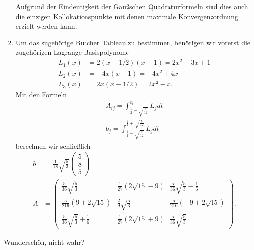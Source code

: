 \begin{solution}
\begin{enumerate}[label = \textbf{\alph*)}]
  Aufgrund der Eindeutigkeit der Gaußschen Quadraturformeln sind dies auch die
  einzigen Kollokationspunkte mit denen maximale Konvergenzordnung erzielt werden kann.
  \item Um das zugehörige Butcher Tableau zu bestimmen, benötigen wir vorerst die
  zugehörigen Lagrange Basispolynome
  \begin{align*}
    L_1(x) &= 2(x - 1/2)(x - 1) = 2x^2 - 3x + 1\\
    L_2(x) &= -4x(x - 1) = -4x^2 + 4x\\
    L_3(x) &= 2x(x - 1/2) = 2x^2 - x.
  \end{align*}
  Mit den Formeln
  \begin{align*}
    A_{ij} = \int_{\frac{1}{2} - \sqrt{\frac{5}{12}}}^{c_i} L_j dt \\
    b_j = \int_{\frac{1}{2} - \sqrt{\frac{5}{12}}}^{\frac{1}{2} + \sqrt{\frac{5}{12}}} L_j dt
  \end{align*}
  berechnen wir schließlich
  \begin{align*}
    b &= \frac{1}{18}\sqrt{\frac{5}{3}}
    \begin{pmatrix}
       5 \\ 8 \\ 5
    \end{pmatrix}\\
    A &=
     \begin{pmatrix}
      \frac{5}{36}\sqrt{\frac{5}{3}} & \frac{1}{27}\left(2\sqrt{15} - 9\right)
      & \frac{5}{36}\sqrt{\frac{5}{3}} - \frac{1}{6}\\
      \frac{5}{216}\left(9 + 2\sqrt{15}\right) & \frac{2}{9}\sqrt{\frac{5}{3}}
      & \frac{5}{216}\left(-9 + 2\sqrt{15}\right)\\
      \frac{5}{36}\sqrt{\frac{5}{3}} + \frac{1}{6} & \frac{1}{27}\left(2\sqrt{15} + 9\right)
      & \frac{5}{36}\sqrt{\frac{5}{3}}
    \end{pmatrix}.
  \end{align*}
\end{enumerate}
Wunderschön, nicht wahr?
\end{solution}
